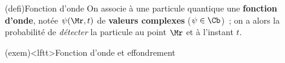 \documentclass[../../main/main.tex]{subfiles}
\begin{document}
\begin{tcb*}(defi){Fonction d'onde}
	On associe à une particule quantique une \textbf{fonction d'onde}, notée $\psi
		(\Mr,t)$ de \textbf{valeurs complexes} ($\psi \in \Cb$)~; on a alors
	\psw{%
		\[
			\boxed{p (\Mr,t) = \abs{\psi (\Mr,t)}^2}
			\qav
			P\ind{tot} = \int_{M \in \Vc} \abs{\psi(\Mr,t)}^2\dd{V}
			\Lra
			1 = \int_{-\infty}^{+\infty} \abs{\psi(\Mr,t)}^2 \dd{V}
		\]
	}%
	la probabilité de \textit{détecter} la particule au point $\Mr$ et à l'instant
	$t$.
\end{tcb*}

\begin{tcb*}[sidebyside](exem)<lftt>{Fonction d'onde et effondrement}
	\begin{center}
	\end{center}
	\tcblower
	\begin{center}
	\end{center}
\end{tcb*}
\end{document}
